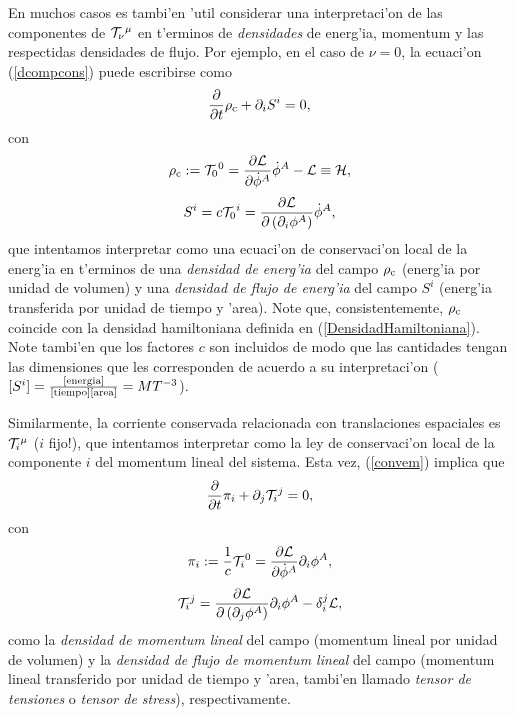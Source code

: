 En muchos casos es tambi'en 'util considerar una interpretaci'on de las
componentes de ${\cal T}_\nu{}^\mu$ en t'erminos de \textit{densidades} de
energ'ia, momentum y las respectidas densidades de flujo. Por ejemplo, en el
caso de $\nu=0$, la ecuaci'on (\ref{dcompcons}) puede escribirse como
\begin{equation}
\frac{\partial}{\partial t}\rho_{\rm c} +\partial_iS^i=0 ,
\end{equation}
con
\begin{equation}
\rho_{\rm c} :={\cal T}_0{}^0=\frac{\partial{\cal L}}{\partial\dot{\phi}^A}\dot{\phi}^A-{\cal L}\equiv {\cal H} ,
\label{densenergia}
\end{equation}
\begin{equation}
S^i=c{\cal T}_0{}^i=\frac{\partial{\cal L}}{\partial\left(\partial_i\phi^A\right)}\dot{\phi}^A\label{flujoenergia} ,
\end{equation}
que intentamos interpretar como una ecuaci'on de conservaci'on local de la
energ'ia en t'erminos de una {\em densidad de energ'ia} del campo $\rho_{\rm c}$
(energ'ia por unidad de volumen) y una {\em densidad de flujo de energ'ia} del
campo $S^i$ (energ'ia  transferida por unidad de tiempo y 'area). Note que,
consistentemente, $\rho_{\rm c}$ coincide con la densidad hamiltoniana definida
en (\ref{DensidadHamiltoniana}). Note tambi'en que los factores $c$ son
incluidos de modo que las cantidades tengan las dimensiones que les corresponden
de acuerdo a su interpretaci'on ($[S^i]=\frac{\rm [energia]}{\rm
[tiempo][area]}=MT^{-3}$).
%
%

Similarmente, la corriente conservada relacionada con translaciones espaciales es
${\cal T}_i{}^\mu $ ($i$ fijo!), que intentamos interpretar como la ley de
conservaci'on local  de la componente $i$ del momentum lineal del sistema. Esta
vez, (\ref{convem}) implica que
\begin{equation}
\frac{\partial}{\partial t}\pi_i +\partial_j{\cal T}_i{}^j=0 ,
\end{equation}
con
\begin{equation}
\pi_i :=\frac{1}{c}{\cal T}_i{}^0=\frac{\partial{\cal
L}}{\partial\dot{\phi}^A}\partial_i\phi^A, \label{DensidadMomentumLineal}
\end{equation}
\begin{equation}
{\cal T}_i{}^j  =\frac{\partial{\cal L}}{\partial\left(
\partial_j\phi^A\right)}\partial_i\phi^A-\delta_i^j{\cal L}\label{Tensor de
stress} ,
\end{equation}
como la \textit{densidad de momentum lineal} del campo (momentum lineal por
unidad de volumen) y la \textit{densidad de flujo de momentum lineal} del campo
(momentum lineal transferido por unidad de tiempo y 'area, tambi'en llamado {\em
tensor de tensiones} o {\em tensor de stress}), respectivamente.

